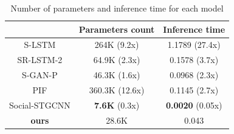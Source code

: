 \protect{}

\begin{table}[hbtp]
  \centering
  \caption{Number of parameters and inference time for each model\protect\footnotemark[6]}
  \label{tab:param-results}
  \begin{tabular}{c||c|c}
   & Parameters count & Inference time \\
  \hline\hline
  S-LSTM \cite{s-lstm} & 264K {\color{blue}(9.2x)} & 1.1789 {\color{blue}(27.4x)} \\
  \hline
  SR-LSTM-2 \cite{sr-lstm} & 64.9K {\color{blue}(2.3x)} & 0.1578 {\color{blue}(3.7x)} \\
  \hline
  S-GAN-P \cite{gupta2018social-s-gan-p} & 46.3K {\color{blue}(1.6x)} & 0.0968 {\color{blue}(2.3x)} \\
  \hline
  PIF \cite{liang2019peeking-pif} & 360.3K {\color{blue}(12.6x)} & 0.1145 {\color{blue}(2.7x)} \\
  \hline
  Social-STGCNN \cite{s-stgcnn} & \textbf{7.6K} {\color{blue}(0.3x)} & \textbf{0.0020} {\color{blue}(0.05x)} \\
  \hline \hline
  \textbf{ours} & 28.6K & 0.043 \\
  \hline 
  \end{tabular}
\end{table}

\protect{}

\newpage
